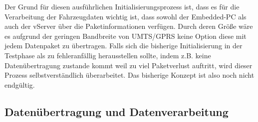 \documentclass[fontsize = 12pt, paper = a4]{scrreprt}
\begin{document}
Der Grund für diesen ausführlichen Initialisierungsprozess ist, dass es für die Verarbeitung der Fahrzeugdaten wichtig ist, dass sowohl der Embedded-PC als auch der vServer über die Paketinformationen verfügen. Durch deren Größe wäre es aufgrund der geringen Bandbreite von UMTS/GPRS keine Option diese mit jedem Datenpaket zu übertragen. Falls sich die bisherige Initialisierung in der Testphase als zu fehleranfällig herausstellen sollte, indem z.B. keine Datenübertragung zustande kommt weil zu viel Paketverlust auftritt, wird dieser Prozess selbstverständlich überarbeitet. Das bisherige Konzept ist also noch nicht endgültig.

\subsection{Datenübertragung und Datenverarbeitung}
\end{document}
